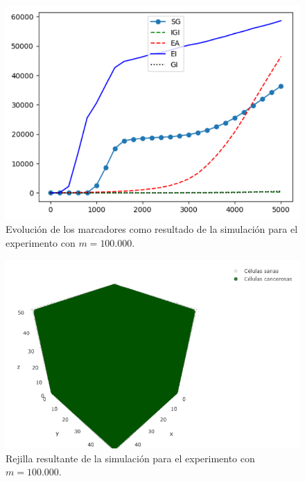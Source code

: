 \begin{figure}[h]
\centering
\includegraphics[scale=0.8]{figures/experiments/exp4/mutations}
\caption{Evolución de los marcadores como resultado de la simulación para el experimento con $m = 100.000$.}
\end{figure}

\begin{figure}[h]
\centering
\includegraphics[scale=0.6]{figures/experiments/exp4/grid}
\caption{Rejilla resultante de la simulación para el experimento con $m = 100.000$.}
\end{figure}
